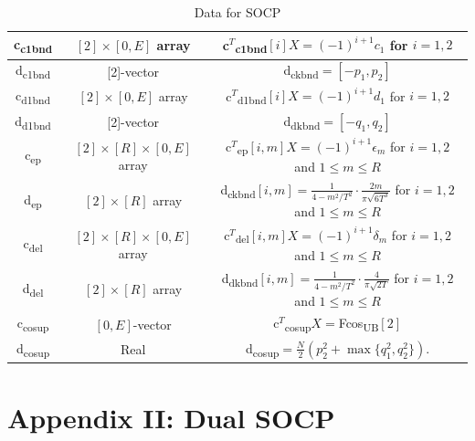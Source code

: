 \documentclass[12pt]{article}
\numberwithin{equation}{section}
\begin{document}
\begin{table}[!h]
\begin{tabular}{| c |c |c|}
 \hline
       c\textsubscript{c1bnd}& $[2] \times [0,E]$ array  &  c$^T$\textsubscript{c1bnd}$[i]X = (-1)^{i+1}c_1$ for $i = 1,2$ \\ 
 \hline
   d\textsubscript{c1bnd}& [2]-vector& d\textsubscript{ckbnd}$ = [-p_1,p_2]$ \\ 
 \hline
       c\textsubscript{d1bnd}& $[2] \times [0,E]$ array  &  c$^T$\textsubscript{d1bnd}$[i]X = (-1)^{i+1}d_1$ for $i = 1,2$ \\ 
 \hline
   d\textsubscript{d1bnd}& [2]-vector  &  d\textsubscript{dkbnd}$ = [-q_1,q_2]$ \\ 
 \hline
        c\textsubscript{ep}& $[2] \times [R] \times [0,E]$ array  &  c$^T$\textsubscript{ep}$[i,m]X = (-1)^{i+1}\epsilon_m$ for $i = 1,2$ and $1 \leq m \leq R$\\ 
 \hline
   d\textsubscript{ep}& $[2] \times [R]$ array & d\textsubscript{ckbnd}$[i,m] = \frac{1}{4-m^2/T^2} \cdot \frac{2m}{\pi \sqrt{6T^3}}$ for  $i = 1,2$ and $1 \leq m \leq R$\\ 
 \hline
       c\textsubscript{del}& $[2] \times [R]\times [0,E]$ array  &  c$^T$\textsubscript{del}$[i,m]X = (-1)^{i+1}\delta_m$ for $i = 1,2$ and $1 \leq m \leq R$ \\ 
 \hline
   d\textsubscript{del}& $[2] \times [R]$ array  &  d\textsubscript{dkbnd}$[i,m] =  \frac{1}{4-m^2/T^2}\cdot \frac{4}{\pi\sqrt{2T}} $ for $i = 1,2$ and $1 \leq m \leq R$ \\ 
 \hline
        c\textsubscript{cosup}& $[0,E]$-vector  &  c$^T$\textsubscript{cosup}$X =  $Fcos\textsubscript{UB}$[2]$ \\ 
 \hline
   d\textsubscript{cosup}& Real & d\textsubscript{cosup}$=\frac{N}{2}(p_2^2 + \max\{q_1^2,q_2^2\})$. \\ 
 \hline
  

\end{tabular}


\caption{Data for SOCP}
\label{socpdata}
\end{table}

\normalsize




\clearpage

\section{Appendix II: Dual SOCP}
\end{document}
